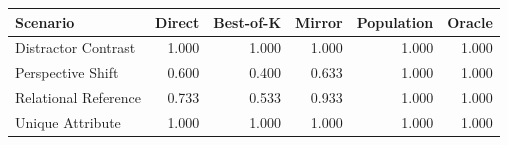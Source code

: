 \begin{tabular}{lrrrrr}
\toprule
Scenario & Direct & Best-of-K & Mirror & Population & Oracle \\
\midrule
Distractor Contrast & 1.000 & 1.000 & 1.000 & 1.000 & 1.000 \\
Perspective Shift & 0.600 & 0.400 & 0.633 & 1.000 & 1.000 \\
Relational Reference & 0.733 & 0.533 & 0.933 & 1.000 & 1.000 \\
Unique Attribute & 1.000 & 1.000 & 1.000 & 1.000 & 1.000 \\
\bottomrule
\end{tabular}
